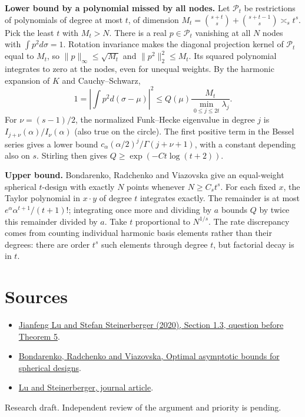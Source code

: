 \documentclass[11pt]{article}
\begin{document}
\textbf{Lower bound by a polynomial missed by all nodes.} Let $\mathcal P_t$ be restrictions of polynomials of degree at most $t$, of dimension $M_t=\binom{s+t}{s}+\binom{s+t-1}{s}\asymp_s t^s$. Pick the least $t$ with $M_t>N$. There is a real $p\in\mathcal P_t$ vanishing at all $N$ nodes with $\int p^2d\sigma=1$. Rotation invariance makes the diagonal projection kernel of $\mathcal P_t$ equal to $M_t$, so $\|p\|_\infty\le\sqrt{M_t}$ and $\|p^2\|_2^2\le M_t$. Its squared polynomial integrates to zero at the nodes, even for unequal weights. By the harmonic expansion of $K$ and Cauchy--Schwarz,
\[
 1=\left|\int p^2d(\sigma-\mu)\right|^2
 \le Q(\mu)\frac{M_t}{\min_{0\le j\le 2t}\lambda_j}.
\]
For $\nu=(s-1)/2$, the normalized Funk--Hecke eigenvalue in degree $j$ is $I_{j+\nu}(\alpha)/I_\nu(\alpha)$ (also true on the circle). The first positive term in the Bessel series gives a lower bound $c_\alpha(\alpha/2)^j/\Gamma(j+\nu+1)$, with a constant depending also on $s$. Stirling then gives $Q\ge\exp(-Ct\log(t+2))$.

\textbf{Upper bound.} Bondarenko, Radchenko and Viazovska give an equal-weight spherical $t$-design with exactly $N$ points whenever $N\ge C_s t^s$. For each fixed $x$, the Taylor polynomial in $x\cdot y$ of degree $t$ integrates exactly. The remainder is at most $e^\alpha\alpha^{t+1}/(t+1)!$; integrating once more and dividing by $a$ bounds $Q$ by twice this remainder divided by $a$. Take $t$ proportional to $N^{1/s}$. The rate discrepancy comes from counting individual harmonic basis elements rather than their degrees: there are order $t^s$ such elements through degree $t$, but factorial decay is in $t$.

\section*{Sources}
\begin{itemize}\setlength{\itemsep}{0pt}\setlength{\parskip}{0pt}
\item \href{https://arxiv.org/abs/2012.08465v2}{Jianfeng Lu and Stefan Steinerberger (2020), Section 1.3, question before Theorem 5}.
\item \href{https://annals.math.princeton.edu/2013/178-2/p02}{Bondarenko, Radchenko and Viazovska, Optimal asymptotic bounds for spherical designs}.
\item \href{https://www.sciencedirect.com/science/article/abs/pii/S1063520321001123}{Lu and Steinerberger, journal article}.
\end{itemize}
{\small Research draft. Independent review of the argument and priority is pending.}
\end{document}
